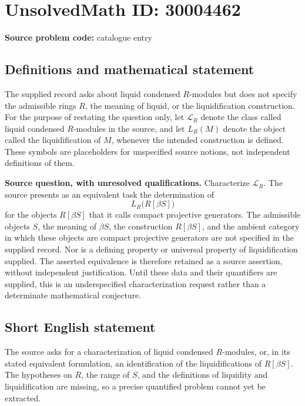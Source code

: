 \documentclass[11pt]{article}
\begin{document}
\section*{UnsolvedMath ID: 30004462}
\textbf{Source problem code:} catalogue entry
\subsection{Definitions and mathematical statement}
The supplied record asks about liquid condensed \(R\)-modules but does not specify the admissible rings \(R\), the meaning of liquid, or the liquidification construction. For the purpose of restating the question only, let \(\mathcal L_R\) denote the class called liquid condensed \(R\)-modules in the source, and let \(L_R(M)\) denote the object called the liquidification of \(M\), whenever the intended construction is defined. These symbols are placeholders for unspecified source notions, not independent definitions of them.

\textbf{Source question, with unresolved qualifications.} Characterize \(\mathcal L_R\). The source presents as an equivalent task the determination of
\[
L_R\bigl(R[\beta S]\bigr)
\]
for the objects \(R[\beta S]\) that it calls compact projective generators. The admissible objects \(S\), the meaning of \(\beta S\), the construction \(R[\beta S]\), and the ambient category in which these objects are compact projective generators are not specified in the supplied record. Nor is a defining property or universal property of liquidification supplied. The asserted equivalence is therefore retained as a source assertion, without independent justification. Until these data and their quantifiers are supplied, this is an underspecified characterization request rather than a determinate mathematical conjecture.
\subsection{Short English statement}
The source asks for a characterization of liquid condensed \(R\)-modules, or, in its stated equivalent formulation, an identification of the liquidifications of \(R[\beta S]\). The hypotheses on \(R\), the range of \(S\), and the definitions of liquidity and liquidification are missing, so a precise quantified problem cannot yet be extracted.
\end{document}
